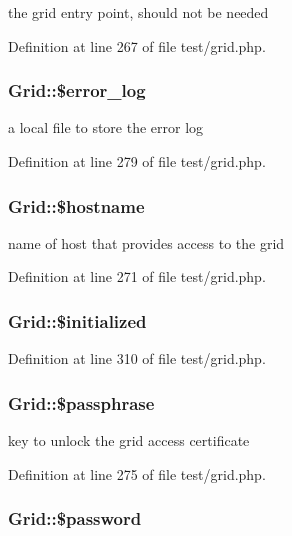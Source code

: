 the grid entry point, should not be needed 



Definition at line 267 of file test/grid.php.
\subsubsection{\setlength{\rightskip}{0pt plus 5cm}Grid::\$error\_\-log}\label{classGrid_o6}


a local file to store the error log 



Definition at line 279 of file test/grid.php.
\subsubsection{\setlength{\rightskip}{0pt plus 5cm}Grid::\$hostname}\label{classGrid_o2}


name of host that provides access to the grid 



Definition at line 271 of file test/grid.php.
\subsubsection{\setlength{\rightskip}{0pt plus 5cm}Grid::\$initialized}\label{classGrid_o11}




Definition at line 310 of file test/grid.php.
\subsubsection{\setlength{\rightskip}{0pt plus 5cm}Grid::\$passphrase}\label{classGrid_o4}


key to unlock the grid access certificate 



Definition at line 275 of file test/grid.php.
\subsubsection{\setlength{\rightskip}{0pt plus 5cm}Grid::\$password}\label{classGrid_o3}


